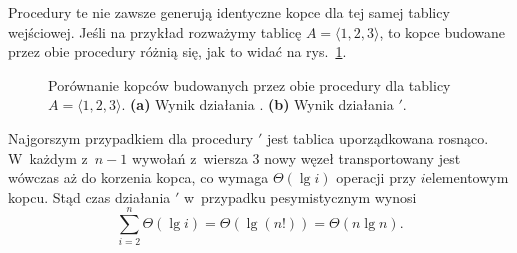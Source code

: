 
\subproblem %
Procedury te nie zawsze generują identyczne kopce dla tej samej tablicy wejściowej.
Jeśli na przykład rozważymy tablicę $A=\langle1,2,3\rangle$, to kopce budowane przez obie procedury różnią się, jak to widać na rys.\ \ref{fig:6-1(a)}.
\begin{figure}[!ht]
	\centering 
	\caption{Porównanie kopców budowanych przez obie procedury dla tablicy $A=\langle1,2,3\rangle$.
{\sffamily\bfseries(a)} Wynik działania .
{\sffamily\bfseries(b)} Wynik działania $'$.} \label{fig:6-1(a)}
\end{figure}

\subproblem %
Najgorszym przypadkiem dla procedury $'$ jest tablica uporządkowana rosnąco.
W~każdym z~$n-1$ wywołań  z~wiersza 3 nowy węzeł transportowany jest wówczas aż do korzenia kopca, co wymaga $\Theta(\lg i)$ operacji przy $i$\nbhyphen elementowym kopcu.
Stąd czas działania $'$ w~przypadku pesymistycznym wynosi
\[
	\sum_{i=2}^n\Theta(\lg i) = \Theta(\lg(n!)) = \Theta(n\lg n).
\]
